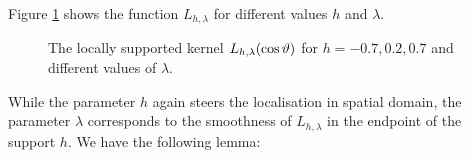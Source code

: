 \documentclass[11pt,a4paper,twoside,bibtotoc]{scrartcl}
\theoremstyle{plain}
\theoremstyle{definition}
\theoremstyle{remark}
\newcommand{\fun}[2]{\ensuremath{#1{\hspace{-0.4ex}}\left(#2\right)}}
\numberwithin{equation}{section}
\numberwithin{table}{section}
\numberwithin{figure}{section}
\begin{document}
Figure \ref{Basics:Figure:LKernel} shows the function $L_{h,\lambda}$ for
different values $h$ and $\lambda$.
\begin{figure}[tb]
  \centering
  \hfill
  \caption{The locally supported kernel $\fun{L_{h,\lambda}}{\cos\vartheta}$ 
  for $h = -0.7, 0.2, 0.7$ and different values of $\lambda$.}
  \label{Basics:Figure:LKernel}
\end{figure}
While the parameter $h$ again steers the localisation in spatial domain, the
parameter $\lambda$ corresponds to the smoothness of $L_{h,\lambda}$ in the
endpoint of the support $h$.
We have the following lemma:
\end{document}
